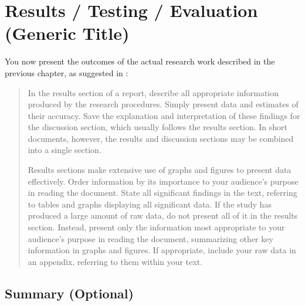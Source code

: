 \chapter{Results / Testing / Evaluation (Generic Title)}
\label{chap:evaluation} 

You now present the outcomes of the actual research work described in the previous chapter, as suggested in \parencite{perelman97mht}:


\begin{quotation}
In the results section of a report, describe all appropriate information produced by the research procedures. Simply present data and estimates of their accuracy. Save the explanation and interpretation of these findings for the discussion section, which usually follows the results section. In short documents, however, the results and discussion sections may be combined into a single section.

Results sections make extensive use of graphs and figures to present data effectively. Order information by its importance to your audience's purpose in reading the document. State all significant findings in the text, referring to tables and graphs displaying all significant data. If the study has produced a large amount of raw data, do not present all of it in the results section. Instead, present only the information most appropriate to your audience's purpose in reading the document, summarizing other key information in graphs and figures. If appropriate, include your raw data in an appendix, referring to them within your text.
\end{quotation}

\lipsum[52-60]

\section{Summary (Optional)}



